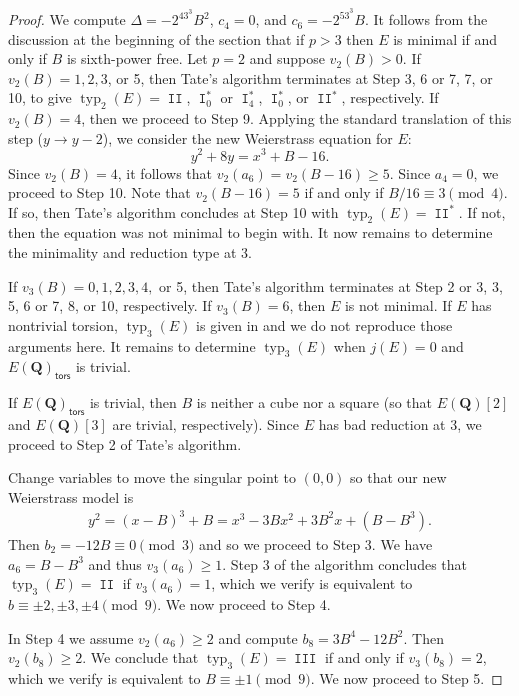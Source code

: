 \documentclass{amsart}
\newcommand{\Q}{\mathbf{Q}}
\newcommand{\tors}{\mathsf{tors}}
\DeclareMathOperator{\typ}{{typ}}
\DeclareMathOperator{\I}{\mathtt{I}}
\DeclareMathOperator{\II}{\mathtt{II}}
\DeclareMathOperator{\III}{\mathtt{III}}
\numberwithin{equation}{section}
\theoremstyle{plain}
\theoremstyle{remark}
\begin{document}
\begin{proof}
We compute  $\Delta = -2^43^3B^2$, $c_4 = 0$, and $c_6 = -2^53^3B$.  It follows from the discussion at the beginning of the section that if $p>3$ then $E$ is minimal if and only if $B$ is sixth-power free.  Let $p=2$ and suppose $v_2(B) >0$. If $v_2(B) = 1,2,3$,  or 5, then Tate's algorithm terminates at Step 3, 6 or 7, 7, or 10, to give $\typ_2(E) = \II$, $\I_0^*$ or $\I_4^*$, $\I_0^*$, or $\II^*$, respectively.   If $v_2(B) = 4$, then we proceed to Step 9.  Applying the standard translation of this step ($y \to y-2$), we consider the new Weierstrass equation for $E$:
\[
y^2 + 8y = x^3 + B - 16.
\]
Since $v_2(B) = 4$, it follows that $v_2(a_6) = v_2(B - 16) \geq 5$.  Since $a_4 =0$, we proceed to Step 10.  Note that $v_2(B-16) = 5$ if and only if $B/16 \equiv 3 \pmod{4}$. If so, then Tate's algorithm concludes at Step 10 with $\typ_2(E) = \II^*$.  If not, then the equation was not minimal to begin with. It now remains to determine the minimality and reduction type at 3.

If $v_3(B) = 0,1,2,3,4,$ or 5, then Tate's algorithm terminates at Step 2 or 3, 3, 5, 6 or 7, 8, or 10, respectively.  If $v_3(B)=6$, then $E$ is not minimal.  If $E$ has nontrivial torsion, $\typ_3(E)$ is given in \cite[Thms.~3.1, 3.4, 3.7]{br} and we do not reproduce those arguments here.  It remains to determine  $\typ_3(E)$ when $j(E) = 0$ and $E(\Q)_\tors$ is trivial.

If $E(\Q)_\tors$ is trivial, then $B$ is neither a cube nor a square (so that $E(\Q)[2]$ and $E(\Q)[3]$ are trivial, respectively).   Since $E$ has bad reduction at 3, we proceed to Step 2 of Tate's algorithm.  

Change variables to move the singular point to $(0,0)$ so that our new Weierstrass model is 
\begin{align} \label{step_2}
y^2 = (x-B)^3 + B = x^3 - 3Bx^2 + 3B^2x + (B-B^3).
\end{align}
Then $b_2 = -12B \equiv 0 \pmod{3}$ and so we proceed to Step 3.  We have $a_6 = B-B^3$ and thus $v_3(a_6) \geq 1$.  Step 3 of the algorithm concludes that $\typ_3(E) = \II$ if $v_3(a_6) = 1$, which we verify is equivalent to $b \equiv \pm 2, \pm 3, \pm 4 \pmod{9}$. We now proceed to Step 4.

In Step 4 we assume $v_2(a_6) \geq 2$ and compute $b_8 = 3B^4 - 12B^2$.  Then $v_2(b_8) \geq 2$.  We conclude that $\typ_3(E) = \III$ if and only if $v_3(b_8) =2$, which we verify is equivalent to $B \equiv \pm 1 \pmod{9}$.  We now proceed to Step 5.


\end{proof}
\end{document}
